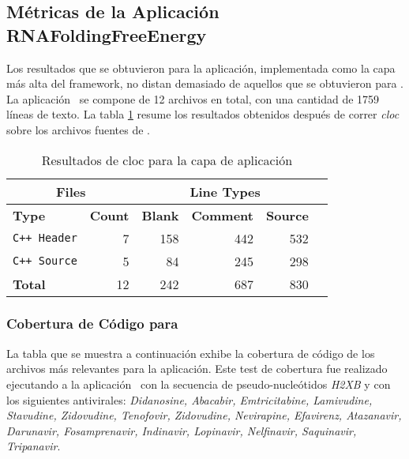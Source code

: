   \subsection{M\'etricas de la Aplicaci\'on \textbf{RNAFoldingFreeEnergy}}
    Los resultados que se obtuvieron para la aplicaci\'on, implementada como la capa m\'as alta del framework, no distan demasiado de aquellos que se
    obtuvieron para \combeng. La aplicaci\'on \rnaffe \ se compone de 12 archivos en total, con una cantidad de 1759 l\'ineas de texto. La
    tabla \ref{clocRnaFFE} resume los resultados obtenidos despu\'es de correr \textit{cloc} sobre los archivos fuentes de \rnaffe.
    
    \begin{table}[!htf]
      \begin{center}
        \begin{tabular}{|l|r|r|r|r|c|}
          \hline
          \multicolumn{2}{|c|}{Files} & \multicolumn{3}{|c|}{Line Types} \\
          \hline
          \textbf{Type} & \textbf{Count} & \textbf{Blank} & \textbf{Comment} & \textbf{Source} \\
          \hline
          \texttt{C++ Header} & 7  &  158  &   442  &    532 \\
          \hline
          \texttt{C++ Source} & 5  &   84  &   245  &    298 \\
          \hline
          \textbf{Total}      & 12 &  242  &   687   &   830 \\
          \hline
        \end{tabular}
        \caption{Resultados de cloc para la capa de aplicaci\'on \rnaffe}\label{clocRnaFFE}
      \end{center}
    \end{table}

    \subsubsection{Cobertura de C\'odigo para \rnaffe}
      La tabla que se muestra a continuaci\'on exhibe la cobertura de c\'odigo de los archivos m\'as relevantes para la aplicaci\'on. Este test de
      cobertura fue realizado ejecutando a la aplicaci\'on \rnaffe \ con la secuencia de pseudo-nucle\'otidos \emph{H2XB} y con los siguientes
      antivirales: \emph{Didanosine, Abacabir, Emtricitabine, Lamivudine, Stavudine, Zidovudine, Tenofovir, Zidovudine, Nevirapine, Efavirenz, Atazanavir, 
      Darunavir, Fosamprenavir, Indinavir, Lopinavir, Nelfinavir, Saquinavir, Tripanavir}.

